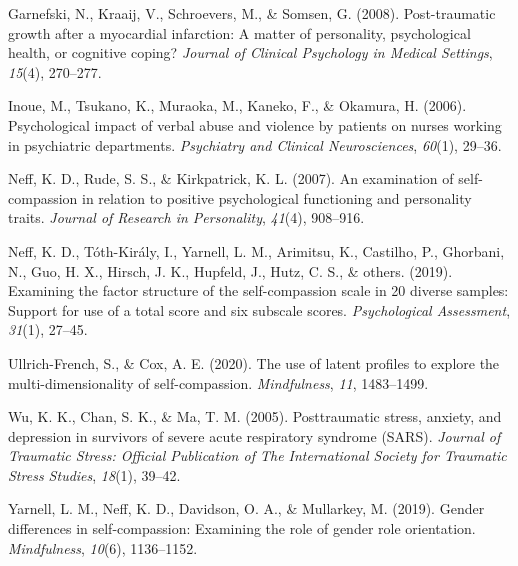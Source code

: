 \documentclass[aps,floatfix,prl]{revtex4}
\begin{document}
\hypertarget{refs}{}
\begin{CSLReferences}{1}{0}
\leavevmode\hypertarget{ref-garnefski2008post}{}%
Garnefski, N., Kraaij, V., Schroevers, M., \& Somsen, G. (2008).
Post-traumatic growth after a myocardial infarction: A matter of
personality, psychological health, or cognitive coping? \emph{Journal of
Clinical Psychology in Medical Settings}, \emph{15}(4), 270--277.

\leavevmode\hypertarget{ref-inoue2006psychological}{}%
Inoue, M., Tsukano, K., Muraoka, M., Kaneko, F., \& Okamura, H. (2006).
Psychological impact of verbal abuse and violence by patients on nurses
working in psychiatric departments. \emph{Psychiatry and Clinical
Neurosciences}, \emph{60}(1), 29--36.

\leavevmode\hypertarget{ref-neff2007examination}{}%
Neff, K. D., Rude, S. S., \& Kirkpatrick, K. L. (2007). An examination
of self-compassion in relation to positive psychological functioning and
personality traits. \emph{Journal of Research in Personality},
\emph{41}(4), 908--916.

\leavevmode\hypertarget{ref-neff2019examining}{}%
Neff, K. D., Tóth-Király, I., Yarnell, L. M., Arimitsu, K., Castilho,
P., Ghorbani, N., Guo, H. X., Hirsch, J. K., Hupfeld, J., Hutz, C. S.,
\& others. (2019). Examining the factor structure of the self-compassion
scale in 20 diverse samples: Support for use of a total score and six
subscale scores. \emph{Psychological Assessment}, \emph{31}(1), 27--45.

\leavevmode\hypertarget{ref-ullrich2020use}{}%
Ullrich-French, S., \& Cox, A. E. (2020). The use of latent profiles to
explore the multi-dimensionality of self-compassion. \emph{Mindfulness},
\emph{11}, 1483--1499.

\leavevmode\hypertarget{ref-wu2005posttraumatic}{}%
Wu, K. K., Chan, S. K., \& Ma, T. M. (2005). Posttraumatic stress,
anxiety, and depression in survivors of severe acute respiratory
syndrome (SARS). \emph{Journal of Traumatic Stress: Official Publication
of The International Society for Traumatic Stress Studies},
\emph{18}(1), 39--42.

\leavevmode\hypertarget{ref-yarnell2019gender}{}%
Yarnell, L. M., Neff, K. D., Davidson, O. A., \& Mullarkey, M. (2019).
Gender differences in self-compassion: Examining the role of gender role
orientation. \emph{Mindfulness}, \emph{10}(6), 1136--1152.

\end{CSLReferences}
\end{document}
